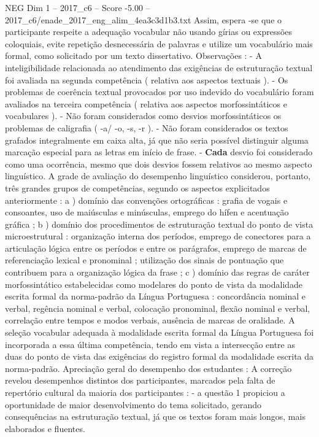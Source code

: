 \begin{textsample}{NEG Dim 1 – 2017\_c6 – Score -5.00 – 2017\_c6/enade\_2017\_eng\_alim\_4ea3c3d1b3.txt}
Assim, espera -se que o participante respeite a adequação vocabular não usando gírias ou expressões coloquiais, evite repetição desnecessária de palavras e utilize um vocabulário mais formal, como solicitado por um texto dissertativo.
Observações : - A inteligibilidade relacionada ao atendimento das exigências de estruturação textual foi avaliada na segunda competência ( relativa aos aspectos textuais ). - Os problemas de coerência textual provocados por uso indevido do vocabulário foram avaliados na terceira competência ( relativa aos aspectos morfossintáticos e vocabulares ). - Não foram considerados como desvios morfossintáticos os problemas de caligrafia ( -a/ -o, -s, -r ). - Não foram considerados os textos grafados integralmente em caixa alta, já que não seria possível distinguir alguma marcação especial para as letras em início de frase. - \textbf{Cada} desvio foi considerado como uma ocorrência, mesmo que dois desvios fossem relativos ao mesmo aspecto linguístico.
A grade de avaliação do desempenho linguístico considerou, portanto, três grandes grupos de competências, segundo os aspectos explicitados anteriormente : a ) domínio das convenções ortográficas : grafia de vogais e consoantes, uso de maiúsculas e minúsculas, emprego do hífen e acentuação gráfica ; b ) domínio dos procedimentos de estruturação textual do ponto de vista microestrutural : organização interna dos períodos, emprego de conectores para a articulação lógica entre os períodos e entre os parágrafos, emprego de marcas de referenciação lexical e pronominal ; utilização dos sinais de pontuação que contribuem para a organização lógica da frase ; c ) domínio das regras de caráter morfossintático estabelecidas como modelares do ponto de vista da modalidade escrita formal da norma-padrão da Língua Portuguesa : concordância nominal e verbal, regência nominal e verbal, colocação pronominal, flexão nominal e verbal, correlação entre tempos e modos verbais, ausência de marcas de oralidade.
A seleção vocabular adequada à modalidade escrita formal da Língua Portuguesa foi incorporada a essa última competência, tendo em vista a intersecção entre as duas do ponto de vista das exigências do registro formal da modalidade escrita da norma-padrão.
Apreciação geral do desempenho dos estudantes : A correção revelou desempenhos distintos dos participantes, marcados pela falta de repertório cultural da maioria dos participantes : - a questão 1 propiciou a oportunidade de maior desenvolvimento do tema solicitado, gerando consequências na estruturação textual, já que os textos foram mais longos, mais elaborados e fluentes.

\end{textsample}
